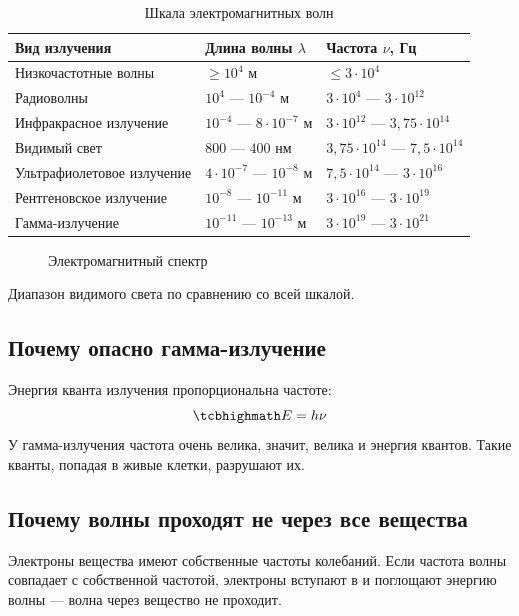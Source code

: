 \documentclass[11pt,a4paper]{article}
\begin{document}
\begin{table}[H]
\centering
\renewcommand{\arraystretch}{1.45}
\begin{tabular}{lll}
\toprule
{\hfont\color{kviolet}Вид излучения} & {\hfont\color{kviolet}Длина волны $\lambda$} & {\hfont\color{kviolet}Частота $\nu$, Гц}\\
\midrule
Низкочастотные волны & $\geqslant10^4$ м & $\leqslant3\cdot10^4$\\
Радиоволны & $10^4$ — $10^{-4}$ м & $3\cdot10^4$ — $3\cdot10^{12}$\\
Инфракрасное излучение & $10^{-4}$ — $8\cdot10^{-7}$ м & $3\cdot10^{12}$ — $3{,}75\cdot10^{14}$\\
Видимый свет & $800$ — $400$ нм & $3{,}75\cdot10^{14}$ — $7{,}5\cdot10^{14}$\\
Ультрафиолетовое излучение & $4\cdot10^{-7}$ — $10^{-8}$ м & $7{,}5\cdot10^{14}$ — $3\cdot10^{16}$\\
Рентгеновское излучение & $10^{-8}$ — $10^{-11}$ м & $3\cdot10^{16}$ — $3\cdot10^{19}$\\
Гамма-излучение & $10^{-11}$ — $10^{-13}$ м & $3\cdot10^{19}$ — $3\cdot10^{21}$\\
\bottomrule
\end{tabular}
\caption{Шкала электромагнитных волн}
\end{table}

\begin{figure}[H]
\centering
{}
\caption{Электромагнитный спектр}
\end{figure}

Диапазон видимого света  по сравнению со всей шкалой.

\subsection{Почему опасно гамма-излучение}
Энергия кванта излучения пропорциональна частоте:
\[
\kbox{E=h\nu}
\]
У гамма-излучения частота очень велика, значит, велика и энергия квантов. Такие кванты, попадая в живые клетки, разрушают их.

\subsection{Почему волны проходят не через все вещества}
Электроны вещества имеют собственные частоты колебаний. Если частота волны совпадает с собственной частотой, электроны вступают
в  и поглощают энергию волны — волна через вещество не проходит.
\end{document}
